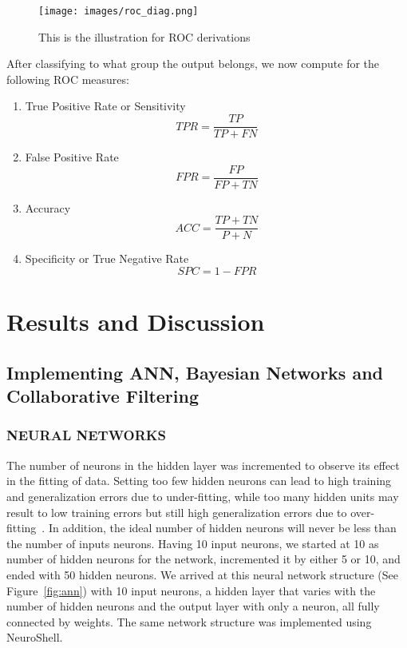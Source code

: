\documentclass[journal]{./IEEE/IEEEtran}
\begin{document}
\begin{figure}[h]
\begin{center}
\texttt{[image: images/roc\_diag.png]}
\caption{This is the illustration for ROC derivations}
\label{fig:roc}
\end{center}
\end{figure}

	After classifying to what group the output belongs, we now compute for the following ROC measures:

\begin{enumerate}
	\item True Positive Rate or Sensitivity
	\begin{equation}
	TPR = \frac{TP}{TP + FN}
	\end{equation}

	\item False Positive Rate
	\begin{equation}
	FPR = \frac{FP}{FP + TN}
	\end{equation}

	\item Accuracy
	\begin{equation}
	ACC = \frac{TP + TN}{P+N}
	\end{equation}

	\item Specificity or True Negative Rate
	\begin{equation}
	SPC = 1 - FPR
	\end{equation} 
\end{enumerate}

\section{Results and Discussion}
\subsection{Implementing ANN, Bayesian Networks and Collaborative Filtering}
\subsubsection {NEURAL NETWORKS}

	 The number of neurons in the hidden layer was incremented to observe its effect in the fitting of data. Setting too few hidden neurons can lead to high training and generalization errors due to under-fitting, while too many hidden units may result to low training errors but still high generalization errors due to over-fitting~\cite{Xu08}. In addition, the ideal number of hidden neurons will never be less than the number of inputs neurons. Having 10 input neurons, we started at 10 as number of hidden neurons for the network, incremented it by either 5 or 10, and ended with 50 hidden neurons. We arrived at this neural network structure (See Figure~\ref{fig:ann}) with 10 input neurons, a hidden layer that varies with the number of hidden neurons and the output layer with only a neuron, all fully connected by weights. The same network structure was implemented using NeuroShell.
\end{document}
